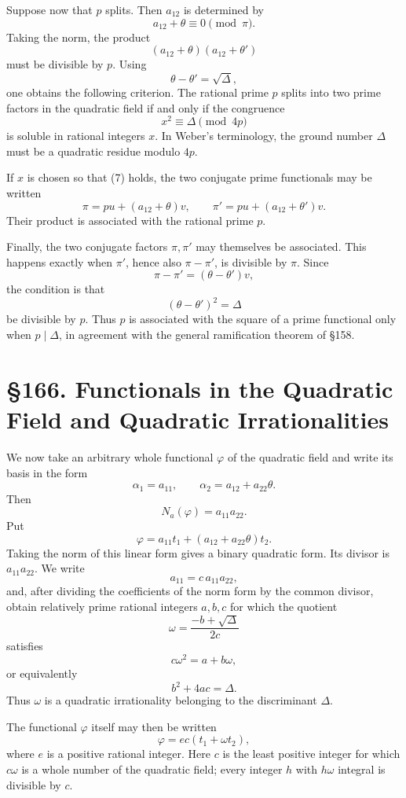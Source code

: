 \documentclass[11pt,a4paper]{book}
\newcommand{\webersection}[2]{\clearpage\section*{\S #1. #2}}
\begin{document}
Suppose now that \(p\) splits.  Then \(a_{12}\) is determined by
\[
  a_{12}+\theta\equiv0\pmod{\pi}.
\tag{6}
\]
Taking the norm, the product
\[
  (a_{12}+\theta)(a_{12}+\theta')
\]
must be divisible by \(p\).  Using
\[
  \theta-\theta'=\sqrt\Delta,
\]
one obtains the following criterion.  The rational prime \(p\) splits into two prime factors in the quadratic field if and only if the congruence
\[
  x^2\equiv\Delta\pmod{4p}
\tag{7}
\]
is soluble in rational integers \(x\).  In Weber's terminology, the ground number \(\Delta\) must be a quadratic residue modulo \(4p\).

If \(x\) is chosen so that (7) holds, the two conjugate prime functionals may be written
\[
  \pi=pu+(a_{12}+\theta)v,\qquad
  \pi'=pu+(a_{12}+\theta')v.
\tag{8}
\]
Their product is associated with the rational prime \(p\).

Finally, the two conjugate factors \(\pi,\pi'\) may themselves be associated.  This happens exactly when \(\pi'\), hence also \(\pi-\pi'\), is divisible by \(\pi\).  Since
\[
  \pi-\pi'=(\theta-\theta')v,
\]
the condition is that
\[
  (\theta-\theta')^2=\Delta
\]
be divisible by \(p\).  Thus \(p\) is associated with the square of a prime functional only when \(p\mid\Delta\), in agreement with the general ramification theorem of \S158.

\webersection{166}{Functionals in the Quadratic Field and Quadratic Irrationalities}

We now take an arbitrary whole functional \(\varphi\) of the quadratic field and write its basis in the form
\[
  \alpha_1=a_{11},\qquad
  \alpha_2=a_{12}+a_{22}\theta.
\tag{1}
\]
Then
\[
  N_a(\varphi)=a_{11}a_{22}.
\tag{2}
\]
Put
\[
  \varphi=a_{11}t_1+(a_{12}+a_{22}\theta)t_2.
\tag{3}
\]
Taking the norm of this linear form gives a binary quadratic form.  Its divisor is \(a_{11}a_{22}\).  We write
\[
  a_{11}=c\,a_{11}a_{22},
\]
and, after dividing the coefficients of the norm form by the common divisor, obtain relatively prime rational integers \(a,b,c\) for which the quotient
\[
  \omega=\frac{-b+\sqrt\Delta}{2c}
\tag{4}
\]
satisfies
\[
  c\omega^2=a+b\omega,
\tag{5}
\]
or equivalently
\[
  b^2+4ac=\Delta.
\tag{6}
\]
Thus \(\omega\) is a quadratic irrationality belonging to the discriminant \(\Delta\).

The functional \(\varphi\) itself may then be written
\[
  \varphi=ec(t_1+\omega t_2),
\tag{7}
\]
where \(e\) is a positive rational integer.  Here \(c\) is the least positive integer for which \(c\omega\) is a whole number of the quadratic field; every integer \(h\) with \(h\omega\) integral is divisible by \(c\).
\end{document}
